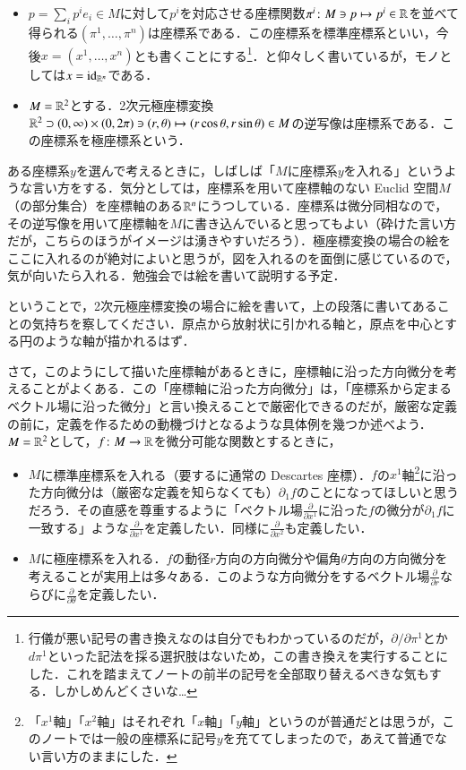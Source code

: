 \begin{exm}[座標系の例]
\leavevmode
\begin{itemize}
\item $p = \sum_i p^i e_i \in M$に対して$p^i$を対応させる座標関数$\pi^i \colon M \ni p \mapsto p^i \in \mathbb{R}$を並べて得られる$(\pi^1, \dots, \pi^n)$は座標系である．この座標系を標準座標系といい，今後$x=(x^1, \dots, x^n)$とも書くことにする\footnote{行儀が悪い記号の書き換えなのは自分でもわかっているのだが，$\partial / \partial \pi ^1$とか$d\pi^1$といった記法を採る選択肢はないため，この書き換えを実行することにした．これを踏まえてノートの前半の記号を全部取り替えるべきな気もする．しかしめんどくさいな…}．と仰々しく書いているが，モノとしては$x = \operatorname{id}_{\mathbb{R}^n}$である．
\item $M = \mathbb{R}^2$とする．2次元極座標変換$\mathbb{R}^2 \supset (0, \infty) \times (0, 2\pi) \ni (r,\theta) \mapsto (r \cos \theta, r \sin \theta) \in M$の逆写像は座標系である．この座標系を極座標系という．
\end{itemize}
\end{exm}

ある座標系$y$を選んで考えるときに，しばしば「$M$に座標系$y$を入れる」というような言い方をする．気分としては，座標系を用いて座標軸のない Euclid 空間$M$（の部分集合）を座標軸のある$\mathbb{R}^n$にうつしている．座標系は微分同相なので，その逆写像を用いて座標軸を$M$に書き込んでいると思ってもよい（砕けた言い方だが，こちらのほうがイメージは湧きやすいだろう）．極座標変換の場合の絵をここに入れるのが絶対によいと思うが，図を入れるのを面倒に感じているので，気が向いたら入れる．勉強会では絵を書いて説明する予定．

\begin{que}
ということで，2次元極座標変換の場合に絵を書いて，上の段落に書いてあることの気持ちを察してください．原点から放射状に引かれる軸と，原点を中心とする円のような軸が描かれるはず．
\end{que}

さて，このようにして描いた座標軸があるときに，座標軸に沿った方向微分を考えることがよくある．この「座標軸に沿った方向微分」は，「座標系から定まるベクトル場に沿った微分」と言い換えることで厳密化できるのだが，厳密な定義の前に，定義を作るための動機づけとなるような具体例を幾つか述べよう．$M=\mathbb{R}^2$として，$f \colon M \to \mathbb{R}$を微分可能な関数とするときに，
\begin{itemize}
\item $M$に標準座標系を入れる（要するに通常の Descartes 座標）．$f$の$x^1$軸\footnote{「$x^1$軸」「$x^2$軸」はそれぞれ「$x$軸」「$y$軸」というのが普通だとは思うが，このノートでは一般の座標系に記号$y$を充ててしまったので，あえて普通でない言い方のままにした．}に沿った方向微分は（厳密な定義を知らなくても）$\partial_1 f$のことになってほしいと思うだろう．その直感を尊重するように「ベクトル場$\frac{\partial}{\partial x^1}$に沿った$f$の微分が$\partial_1 f$に一致する」ような$\frac{\partial}{\partial x^1}$を定義したい．同様に$\frac{\partial}{\partial x^2}$も定義したい．
\item $M$に極座標系を入れる．$f$の動径$r$方向の方向微分や偏角$\theta$方向の方向微分を考えることが実用上は多々ある．このような方向微分をするベクトル場$\frac{\partial}{\partial r}$ならびに$\frac{\partial}{\partial \theta}$を定義したい．
\end{itemize}

